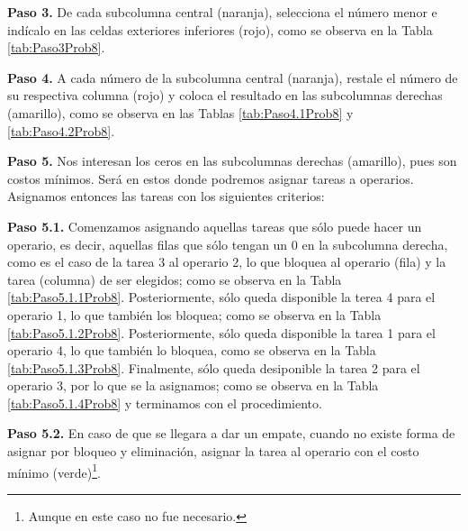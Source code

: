 \documentclass[12pt]{article}  %
\begin{document}
\textbf{Paso 3.} De cada subcolumna central (naranja), selecciona el número menor e indícalo en las celdas exteriores inferiores (rojo), como se observa en la Tabla \ref{tab:Paso3Prob8}.

\textbf{Paso 4.} A cada número de la subcolumna central (naranja), restale el número de su respectiva columna (rojo) y coloca el resultado en las subcolumnas derechas (amarillo), como se observa en las Tablas \ref{tab:Paso4.1Prob8} y \ref{tab:Paso4.2Prob8}.

\textbf{Paso 5.} Nos interesan los ceros en las subcolumnas derechas (amarillo), pues son costos mínimos. Será en estos donde podremos asignar tareas a operarios. Asignamos entonces las tareas con los siguientes criterios:

\textbf{Paso 5.1.} Comenzamos asignando aquellas tareas que sólo puede hacer un operario, es decir, aquellas filas que sólo tengan un 0 en la subcolumna derecha, como es el caso de la tarea 3 al operario 2, lo que bloquea al operario (fila) y la tarea (columna) de ser elegidos; como se observa en la Tabla \ref{tab:Paso5.1.1Prob8}. 
Posteriormente, sólo queda disponible la terea 4 para el operario 1, lo que también los bloquea; como se observa en la Tabla \ref{tab:Paso5.1.2Prob8}.
Posteriormente, sólo queda disponible la tarea 1 para el operario 4, lo que también lo bloquea, como se observa en la Tabla \ref{tab:Paso5.1.3Prob8}.
Finalmente, sólo queda desiponible la tarea 2 para el operario 3, por lo que se la asignamos; como se observa en la Tabla \ref{tab:Paso5.1.4Prob8} y terminamos con el procedimiento.

\textbf{Paso 5.2.} En caso de que se llegara a dar un empate, cuando no existe forma de asignar por bloqueo y eliminación, asignar la tarea al operario con el costo mínimo (verde)\footnote{Aunque en este caso no fue necesario.}.
\end{document}

